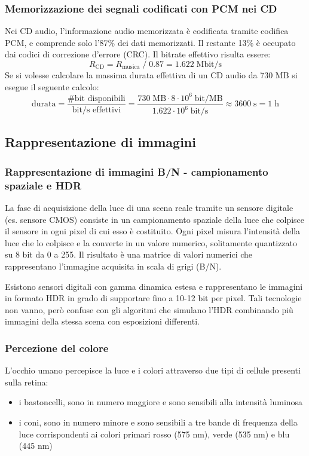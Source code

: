 \subsubsection*{Memorizzazione dei segnali codificati con PCM nei CD}
Nei CD audio, l'informazione audio memorizzata è codificata tramite codifica PCM, e comprende solo l'87\% dei dati memorizzati.
Il restante 13\% è occupato dai codici di correzione d'errore (CRC). Il bitrate effettivo risulta essere:
\[R_\text{CD} = R_\text{musica} \; / \; 0.87 = 1.622 \; \text{Mbit/s}\]
Se si volesse calcolare la massima durata effettiva di un CD audio da 730 MB si esegue il seguente calcolo:
\[\text{durata} = \frac{\text{\# bit disponibili}}{\text{bit/s effettivi}} = \frac{730 \; \text{MB} \cdot 8 \cdot 10^6 \; \text{bit/MB}}{1.622 \cdot 10^6 \; \text{bit/s}} \approx 3600 \; \text{s} = 1 \; \text{h}\]

\subsection{Rappresentazione di immagini}
\subsubsection*{Rappresentazione di immagini B/N - campionamento spaziale e HDR}
La fase di acquisizione della luce di una scena reale tramite un sensore digitale (es. sensore CMOS) consiste in un
campionamento spaziale della luce che colpisce il sensore in ogni pixel di cui esso è costituito. Ogni pixel misura
l'intensità della luce che lo colpisce e la converte in un valore numerico, solitamente quantizzato su 8 bit da 0 a 255.
Il risultato è una matrice di valori numerici che rappresentano l'immagine acquisita in scala di grigi (B/N).

Esistono sensori digitali con gamma dinamica estesa e rappresentano le immagini in formato HDR in grado di supportare fino
a 10-12 bit per pixel. Tali tecnologie non vanno, però confuse con gli algoritmi che simulano l'HDR combinando più immagini
della stessa scena con esposizioni differenti.

\subsubsection*{Percezione del colore}
L'occhio umano percepisce la luce e i colori attraverso due tipi di cellule presenti sulla retina:
\begin{itemize}
	\item i bastoncelli, sono in numero maggiore e sono sensibili alla intensità luminosa
	\item i coni, sono in numero minore e sono sensibili a tre bande di frequenza della luce corrispondenti ai colori
	primari rosso (575 nm), verde (535 nm) e blu (445 nm)
\end{itemize}

